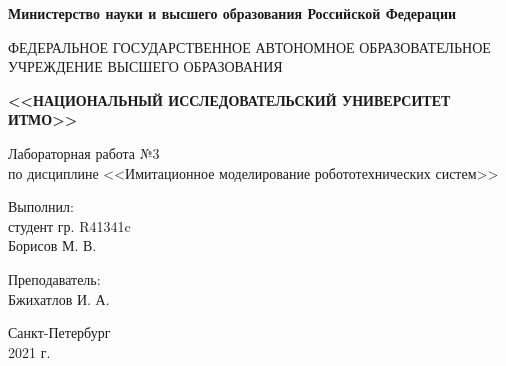 \begin{titlepage}
    \begin{center}
        \begin{small}
            \textbf{Министерство науки и высшего образования Российской Федерации}

            \vspace{1em}

            ФЕДЕРАЛЬНОЕ ГОСУДАРСТВЕННОЕ АВТОНОМНОЕ ОБРАЗОВАТЕЛЬНОЕ\\
            УЧРЕЖДЕНИЕ ВЫСШЕГО ОБРАЗОВАНИЯ

            \vspace{1em}

            \textbf{<<НАЦИОНАЛЬНЫЙ ИССЛЕДОВАТЕЛЬСКИЙ УНИВЕРСИТЕТ ИТМО>>}
        \end{small}

        \vspace{13ex}

        Лабораторная работа №3\\
        по дисциплине <<Имитационное моделирование робототехнических систем>>
    \end{center}

    \vspace{14em}

    \begin{flushright}
        \noindent
        Выполнил:\\
        студент гр. R41341c\\
        Борисов М. В.

        \vspace{1em}
        Преподаватель:\\
        Бжихатлов И. А.
    \end{flushright}

    \vfill

    \begin{center}
        \large{Санкт-Петербург}\\
        2021 г.\\
    \end{center}
\end{titlepage}
